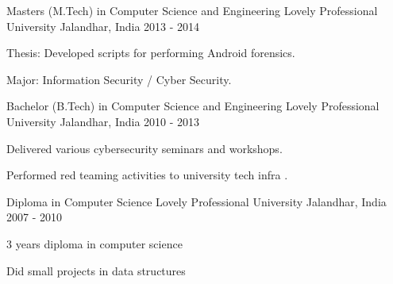 

\begin{cventries}

  \cventry
    {Masters (M.Tech) in Computer Science and Engineering} %
    {Lovely Professional University} %
    {Jalandhar, India} %
    {2013 - 2014} %
    {
      \begin{cvitems} %
        \item {Thesis: Developed scripts for performing Android forensics.}
        \item {Major: Information Security / Cyber Security.}
      \end{cvitems}
    }

  \cventry
    {Bachelor (B.Tech) in Computer Science and Engineering} %
    {Lovely Professional University} %
    {Jalandhar, India} %
    {2010 - 2013} %
    {
      \begin{cvitems} %
        \item {Delivered various cybersecurity seminars and workshops.}
        \item {Performed red teaming activities to university tech infra .}
      \end{cvitems}
    }
  \cventry
    {Diploma in Computer Science} %
    {Lovely Professional University} %
    {Jalandhar, India} %
    {2007 - 2010} %
    {
      \begin{cvitems} %
        \item {3 years diploma in computer science}
        \item {Did small projects in data structures}
      \end{cvitems}
    }    
\end{cventries}
